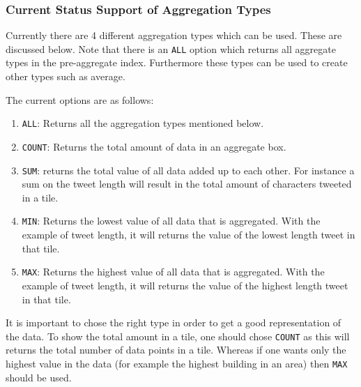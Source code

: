 \subsubsection{Current Status Support of Aggregation Types}
Currently there are 4 different aggregation types which can be used. These are discussed below. Note that there is an \lstinline|ALL| option which returns all aggregate types in the pre-aggregate index. Furthermore these types can be used to create other types such as average.

The current options are as follows:
\begin{enumerate}
\item \lstinline|ALL|: 	Returns all the aggregation types mentioned below.
\item \lstinline|COUNT|: Returns the total amount of data in an aggregate box.
\item \lstinline|SUM|: returns the total value of all data added up to each other. For instance a sum on the tweet length will result in the total amount of characters tweeted in a tile.
\item \lstinline|MIN|: Returns the lowest value of all data that is aggregated. With the example of tweet length, it will returns the value of the lowest length tweet in that tile.
\item \lstinline|MAX|: Returns the highest value of all data that is aggregated. With the example of tweet length, it will returns the value of the highest length tweet in that tile.
\end{enumerate}

It is important to chose the right type in order to get a good representation of the data. To show the total amount in a tile, one should chose \lstinline|COUNT| as this will returns the total number of data points in a tile. Whereas if one wants only the highest value in the data (for example the highest building in an area) then \lstinline|MAX| should be used.
